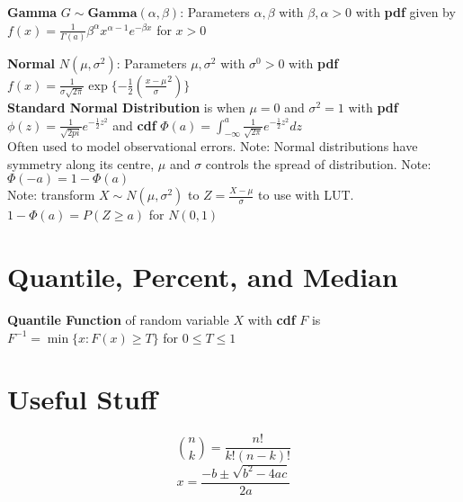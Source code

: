 \documentclass[5pt]{article}
\begin{document}
\begin{definition}
\textbf{Gamma} $G \sim \textbf{Gamma}(\alpha, \beta)$: Parameters $\alpha, \beta$ with $\beta, \alpha > 0$ with \textbf{pdf} given by $f(x)=\frac{1}{\Gamma(a)}\beta^\alpha x^{\alpha - 1} e^{-\beta x}$ for $x>0$\\
\end{definition}

\begin{definition}
\textbf{Normal} $N(\mu, \sigma^2)$: Parameters $\mu, \sigma^2$ with $\sigma^0 > 0$ with \textbf{pdf} $f(x)=\frac{1}{\sigma\sqrt{2\pi}}\exp{\{-\frac{1}{2}(\frac{x-\mu}{\sigma}^2)\}}$\\
\textbf{Standard Normal Distribution} is when $\mu = 0$ and $\sigma^2 = 1$ with \textbf{pdf} $\phi(z) = \frac{1}{\sqrt{2pi}}e^{-\frac{1}{2}z^2}$ and \textbf{cdf} $\Phi(a) = \int^a_{-\infty}\frac{1}{\sqrt{2\pi}}e^{-\frac{1}{2}z^2}dz$\\
Often used to model observational errors. Note: Normal distributions have symmetry along its centre, $\mu$ and $\sigma$ controls the spread of distribution. Note: $\Phi (-a) = 1-\Phi(a)$\\
Note: transform $X \sim N(\mu, \sigma^2)$ to $Z = \frac{X-\mu}{\sigma}$ to use with LUT. $1-\Phi(a) = P(Z\geq a)$ for $N(0,1)$
\end{definition}

\section{Quantile, Percent, and Median}
\begin{definition}
\textbf{Quantile Function} of random variable $X$ with \textbf{cdf} $F$ is $F^{-1}=\min{\{x: F(x) \geq T\}}$ for $0\leq T \leq 1$
\end{definition}
\section{Useful Stuff}
\begin{equation}
{n \choose k} = \frac{n!}{k!(n-k)!}
\end{equation}
\begin{equation}
x=\frac{-b\pm\sqrt{b^2-4ac}}{2a}
\end{equation}
\end{document}
